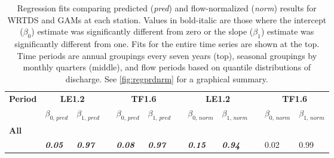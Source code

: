 \documentclass{svjour3}\usepackage[]{graphicx}\usepackage[]{color}
\begin{document}
\begin{table}[!tbp]
\caption{Regression fits comparing predicted ({\it pred}) and flow-normalized ({\it norm}) results for \ac{WRTDS} and \acp{GAM} at each station.  Values in bold-italic are those where the intercept ($\beta_0$) estimate was significantly different from zero or the slope ($\beta_{1}$) estimate was significantly different from one. Fits for the entire time series are shown at the top.  Time periods are annual groupings every seven years (top), seasonal groupings by monthly quarters (middle), and flow periods based on quantile distributions of discharge.  See \cref{fig:regprdnrm} for a graphical summary.\label{tab:regprdnrm}} 
\begin{center}
\begin{tabular}{lllcllcllcll}
\hline\hline
\multicolumn{1}{l}{\bfseries Period}&\multicolumn{2}{c}{\bfseries LE1.2}&\multicolumn{1}{c}{\bfseries }&\multicolumn{2}{c}{\bfseries TF1.6}&\multicolumn{1}{c}{\bfseries }&\multicolumn{2}{c}{\bfseries LE1.2}&\multicolumn{1}{c}{\bfseries }&\multicolumn{2}{c}{\bfseries TF1.6}\tabularnewline
\cline{2-3} \cline{5-6} \cline{8-9} \cline{11-12}
\multicolumn{1}{l}{}&\multicolumn{1}{c}{$\beta_{0,\,pred}$}&\multicolumn{1}{c}{$\beta_{1,\,pred}$}&\multicolumn{1}{c}{}&\multicolumn{1}{c}{$\beta_{0,\,pred}$}&\multicolumn{1}{c}{$\beta_{1,\,pred}$}&\multicolumn{1}{c}{}&\multicolumn{1}{c}{$\beta_{0,\,norm}$}&\multicolumn{1}{c}{$\beta_{1,\,norm}$}&\multicolumn{1}{c}{}&\multicolumn{1}{c}{$\beta_{0,\,norm}$}&\multicolumn{1}{c}{$\beta_{1,\,norm}$}\tabularnewline
\hline
{\bfseries All}&&&&&&&&&&&\tabularnewline
~~&{\bf \textit{0.05}}&{\bf \textit{0.97}}&&{\bf \textit{0.08}}&{\bf \textit{0.97}}&&{\bf \textit{0.15}}&{\bf \textit{0.94}}&&0.02&0.99\tabularnewline

\end{tabular}
\end{center}
\end{table}
\end{document}
